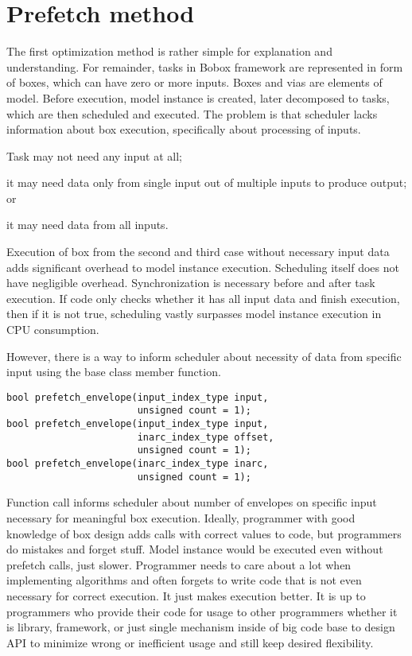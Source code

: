 \chapter{Prefetch method}
\label{prefetch}
The first optimization method is rather simple for explanation and understanding. For remainder, tasks in Bobox framework are represented in form of boxes, which can have zero or more inputs. Boxes and vias are elements of model. Before execution, model instance is created, later decomposed to tasks, which are then scheduled and executed. The problem is that scheduler lacks information about box execution, specifically about processing of inputs.\begin{inparaenum}[\itshape 1\upshape)]
\item Task may not need any input at all;
\item it may need data only from single input out of multiple inputs to produce output; or
\item it may need data from all inputs.
\end{inparaenum} Execution of box from the second and third case without necessary input data adds significant overhead to model instance execution. Scheduling itself does not have negligible overhead. Synchronization is necessary before and after task execution. If code only checks whether it has all input data and finish execution, then if it is not true, scheduling vastly surpasses model instance execution in CPU consumption.

However, there is a way to inform scheduler about necessity of data from specific input using the  base class member function.

\begin{lstlisting}[caption={Basic box prefetch member function overloads.}]
bool prefetch_envelope(input_index_type input,
                       unsigned count = 1);
bool prefetch_envelope(input_index_type input,
                       inarc_index_type offset,
                       unsigned count = 1);
bool prefetch_envelope(inarc_index_type inarc,
                       unsigned count = 1);
\end{lstlisting}

Function call informs scheduler about number of envelopes on specific input necessary for meaningful box execution. Ideally, programmer with good knowledge of box design adds calls with correct values to code, but programmers do mistakes and forget stuff. Model instance would be executed even without prefetch calls, just slower. Programmer needs to care about a lot when implementing algorithms and often forgets to write code that is not even necessary for correct execution. It just makes execution better. It is up to programmers who provide their code for usage to other programmers whether it is library, framework, or just single mechanism inside of big code base to design API to minimize wrong or inefficient usage and still keep desired flexibility.


